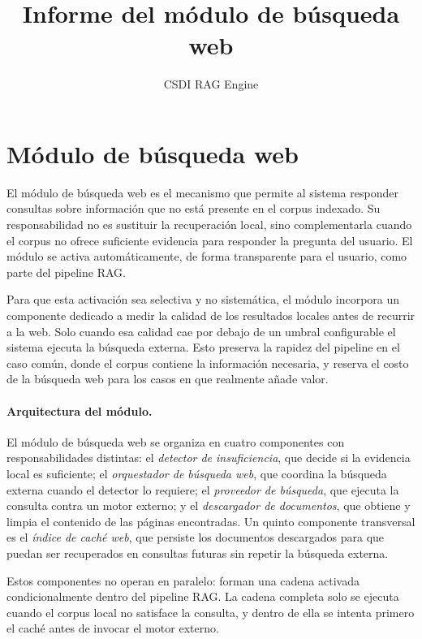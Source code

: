 \documentclass[11pt]{article}
\title{Informe del módulo de búsqueda web}
\author{CSDI RAG Engine}
\date{}
\begin{document}
\maketitle

\section{Módulo de búsqueda web}

El módulo de búsqueda web es el mecanismo que permite al sistema responder consultas sobre
información que no está presente en el corpus indexado. Su responsabilidad no es sustituir la
recuperación local, sino complementarla cuando el corpus no ofrece suficiente evidencia para
responder la pregunta del usuario. El módulo se activa automáticamente, de forma transparente
para el usuario, como parte del pipeline RAG.

Para que esta activación sea selectiva y no sistemática, el módulo incorpora un componente
dedicado a medir la calidad de los resultados locales antes de recurrir a la web. Solo cuando
esa calidad cae por debajo de un umbral configurable el sistema ejecuta la búsqueda externa.
Esto preserva la rapidez del pipeline en el caso común, donde el corpus contiene la información
necesaria, y reserva el costo de la búsqueda web para los casos en que realmente añade valor.

\paragraph{Arquitectura del módulo.}
El módulo de búsqueda web se organiza en cuatro componentes con responsabilidades distintas:
el \emph{detector de insuficiencia}, que decide si la evidencia local es suficiente; el
\emph{orquestador de búsqueda web}, que coordina la búsqueda externa cuando el detector lo
requiere; el \emph{proveedor de búsqueda}, que ejecuta la consulta contra un motor externo; y
el \emph{descargador de documentos}, que obtiene y limpia el contenido de las páginas
encontradas. Un quinto componente transversal es el \emph{índice de caché web}, que persiste
los documentos descargados para que puedan ser recuperados en consultas futuras sin repetir la
búsqueda externa.

Estos componentes no operan en paralelo: forman una cadena activada condicionalmente dentro
del pipeline RAG. La cadena completa solo se ejecuta cuando el corpus local no satisface la
consulta, y dentro de ella se intenta primero el caché antes de invocar el motor externo.
\end{document}
